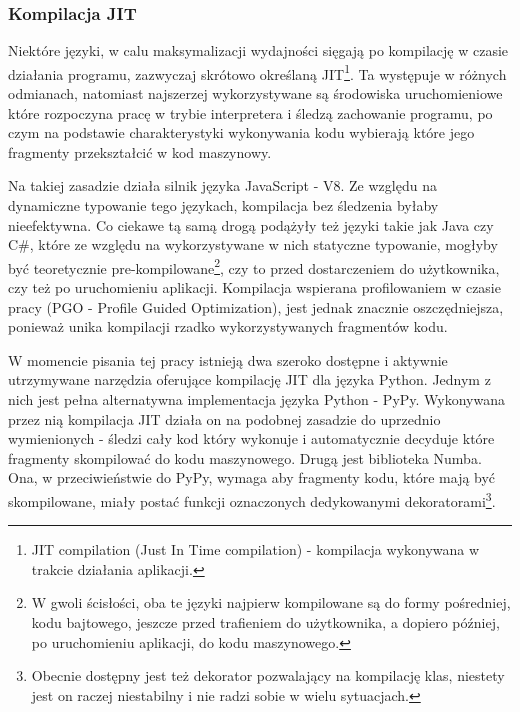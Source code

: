 \documentclass[12pt, a4paper]{article}
\begin{document}
\begin{sloppypar}
    \subsubsection{Kompilacja JIT}


    Niektóre języki, w calu maksymalizacji wydajności sięgają po kompilację w czasie działania
    programu, zazwyczaj skrótowo określaną JIT\footnote{JIT compilation (Just In Time
    compilation) - kompilacja wykonywana w trakcie działania aplikacji\cite{Wikipedia_JIT}.}.
    Ta występuje w różnych odmianach, natomiast najszerzej wykorzystywane są środowiska
    uruchomieniowe które rozpoczyna pracę w trybie interpretera i śledzą zachowanie
    programu, po czym na podstawie charakterystyki wykonywania kodu wybierają które jego
    fragmenty przekształcić w kod maszynowy.

    Na takiej zasadzie działa silnik języka JavaScript - V8\cite{Java_Script_V8}. Ze względu
    na dynamiczne typowanie tego językach, kompilacja bez śledzenia byłaby nieefektywna.
    Co ciekawe tą samą drogą podążyły też języki takie jak Java czy C\#, które ze względu
    na wykorzystywane w nich statyczne typowanie, mogłyby być teoretycznie pre-kompilowane\footnote{W
    gwoli ścisłości, oba te języki najpierw kompilowane są do formy pośredniej, kodu bajtowego,
    jeszcze przed trafieniem do użytkownika, a dopiero później, po uruchomieniu
    aplikacji, do kodu maszynowego\cite{Csh_bytecode}\cite{Java_bytecode}.}, czy to
    przed dostarczeniem do użytkownika, czy też po uruchomieniu aplikacji. Kompilacja
    wspierana profilowaniem w czasie pracy (PGO - Profile Guided Optimization), jest jednak
    znacznie oszczędniejsza, ponieważ unika kompilacji rzadko wykorzystywanych
    fragmentów kodu.

    W momencie pisania tej pracy istnieją dwa szeroko dostępne i aktywnie utrzymywane
    narzędzia oferujące kompilację JIT dla języka Python. Jednym z nich jest pełna alternatywna
    implementacja języka Python - PyPy\cite{PyPy_Home_Page}. Wykonywana przez nią kompilacja
    JIT działa on na podobnej zasadzie do uprzednio wymienionych - śledzi cały kod który
    wykonuje i automatycznie decyduje które fragmenty skompilować do kodu maszynowego\cite{PyPy_JIT}.
    Drugą jest biblioteka Numba\cite{Numba_Article}\cite{Numba_Doc}. Ona, w przeciwieństwie
    do PyPy, wymaga aby fragmenty kodu, które mają być skompilowane, miały postać
    funkcji oznaczonych dedykowanymi dekoratorami\footnote{Obecnie dostępny jest też dekorator
    pozwalający na kompilację klas, niestety jest on raczej niestabilny i nie radzi
    sobie w wielu sytuacjach.}.


\end{sloppypar}
\end{document}
